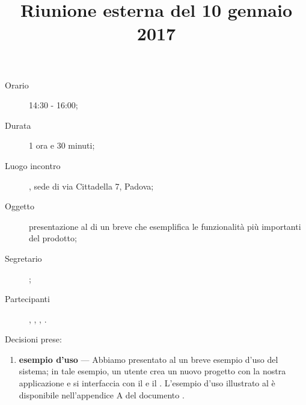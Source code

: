 


\author{\GG}
\supervisor{\MM}
\title{Riunione esterna del 10 gennaio 2017}



\maketitle

\begin{description}
	\item[Orario] 14:30 - 16:00;
	\item[Durata] 1 ora e 30 minuti;
	\item[Luogo incontro] \ZU, sede di via Cittadella 7, Padova;
	\item[Oggetto] presentazione al \GP di un breve  che esemplifica le funzionalità più importanti del prodotto;
	\item[Segretario] \MM; 
	\item[Partecipanti] \GP, \LB, \GG, \MM.
\end{description}

Decisioni prese:
\begin{enumerate}
	\item \textbf{esempio d'uso} --- Abbiamo presentato al \GP un breve esempio d'uso del sistema; in tale esempio, un utente crea un nuovo progetto con la nostra applicazione e si interfaccia con il  e il . L'esempio d'uso illustrato al \GP è disponibile nell'appendice A del documento \AdR.
\end{enumerate}


